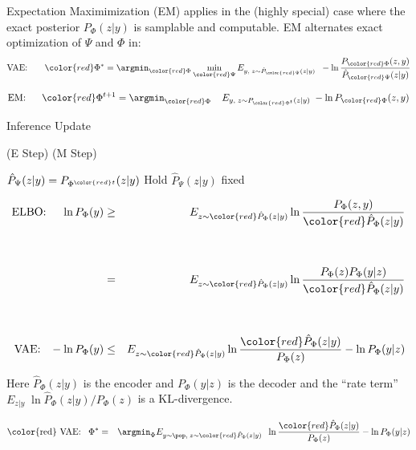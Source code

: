 {

Expectation Maximimization (EM) applies in the (highly special) case where the exact posterior $P_\Phi(z|y)$ is samplable and computable.
EM alternates exact optimization of $\Psi$ and $\Phi$ in:
$$\mbox{VAE:}\;\;\;\;\;\;\; {\color{red} \Phi^*} = \argmin_{\color{red} \Phi} \min_{\color{red} \Psi} E_{y,\;z \sim \hat{P}_{\color{red} \Psi}(z|y)}\;\;- \ln \frac{P_{\color{red} \Phi}(z,y)}{\hat{P}_{\color{red} \Psi}(z|y)}$$

\vfill
$$\mbox{EM:}\;\;\;\;\;\; {\color{red} \Phi^{t+1}} =  \argmin_{\color{red} \Phi}\;\;\;\;E_{y,\;z \sim P_{\color{red} \Phi^t}(z|y)}\; - \ln P_{\color{red} \Phi}(z,y)$$

\vfill
\centerline{\hspace{1em} Inference \hspace{6em} Update \hspace{2.5em}~}
\centerline{(E Step) \hspace{6em} (M Step) ~}
\centerline{ $\hat{P}_\Psi(z|y) = P_{\Phi^{\color{red} t}}(z|y)$ \hspace{2.5em} Hold $\hat{P}_\Psi(z|y)$ fixed \hspace{0em}~}


{\huge
\begin{eqnarray*}
\mbox{ELBO:}\;\;\;\;\;\ln P_\Phi(y)   &  \geq & E_{z \sim {\color{red} \hat{P}_\Phi(z|y)}} \ln \frac{P_\Phi(z,y)}{{\color{red} \hat{P}_\Phi(z|y)}} \\
  \\
  \\
  & = & E_{z \sim {\color{red} \hat{P}_\Phi(z|y)}} \ln \frac{P_\Phi(z)P_\Phi(y|z)}{{\color{red} \hat{P}_\Phi(z|y)}}\\
  \\
  \\
\mbox{VAE:}\;\;\;- \ln P_\Phi(y)  & \leq & E_{z \sim {\color{red} \hat{P}_\Phi(z|y)}} \ln \frac{{\color{red} \hat{P}_\Phi(z|y)}}{P_\Phi(z)}  - \ln P_\Phi(y|z)
\end{eqnarray*}
}

\vfill
Here $\hat{P}_\Phi(z|y)$ is the encoder and $P_\Phi(y|z)$ is the decoder and the ``rate term'' $ E_{z|y}\;\ln \hat{P}_\Phi(z|y)/P_\Phi(z)$ is a KL-divergence.


{\huge
\begin{eqnarray*}
\mbox{\color{red} VAE:}\;\;\;\Phi^*  & = & \argmin_\Phi E_{y \sim \pop,\;z \sim {\color{red} \hat{P}_\Phi(z|y)}}\;\; \ln \frac{{\color{red} \hat{P}_\Phi(z|y)}}{P_\Phi(z)}  - \ln P_\Phi(y|z)
\end{eqnarray*}
}

}
